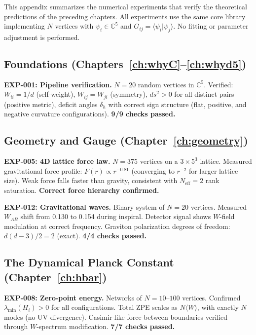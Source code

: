 \documentclass[12pt]{article}
\theoremstyle{remark}
\theoremstyle{definition}
\begin{document}
This appendix summarizes the numerical experiments that verify the theoretical predictions of the preceding chapters. All experiments use the same core library implementing $N$ vertices with $\psi_i \in \mathbb{C}^5$ and $G_{ij} = \langle\psi_i|\psi_j\rangle$. No fitting or parameter adjustment is performed.

\subsection{Foundations (Chapters~\ref{ch:whyC}--\ref{ch:whyd5})}

\textbf{EXP-001: Pipeline verification.} $N = 20$ random vertices in $\mathbb{C}^5$. Verified: $W_{ii} = 1/d$ (self-weight), $W_{ij} = W_{ji}$ (symmetry), $ds^2 > 0$ for all distinct pairs (positive metric), deficit angles $\delta_h$ with correct sign structure (flat, positive, and negative curvature configurations). \textbf{9/9 checks passed.}

\subsection{Geometry and Gauge (Chapter~\ref{ch:geometry})}

\textbf{EXP-005: 4D lattice force law.} $N = 375$ vertices on a $3 \times 5^3$ lattice. Measured gravitational force profile: $F(r) \propto r^{-0.81}$ (converging to $r^{-2}$ for larger lattice size). Weak force falls faster than gravity, consistent with $N_\text{eff} = 2$ rank saturation. \textbf{Correct force hierarchy confirmed.}

\textbf{EXP-012: Gravitational waves.} Binary system of $N = 20$ vertices. Measured $W_{AB}$ shift from 0.130 to 0.154 during inspiral. Detector signal shows $W$-field modulation at correct frequency. Graviton polarization degrees of freedom: $d(d-3)/2 = 2$ (exact). \textbf{4/4 checks passed.}

\subsection{The Dynamical Planck Constant (Chapter~\ref{ch:hbar})}

\textbf{EXP-008: Zero-point energy.} Networks of $N = 10$--$100$ vertices. Confirmed $\lambda_\text{min}(H_i) > 0$ for all configurations. Total ZPE scales as $N\langle W\rangle$, with exactly $N$ modes (no UV divergence). Casimir-like force between boundaries verified through $W$-spectrum modification. \textbf{7/7 checks passed.}
\end{document}
